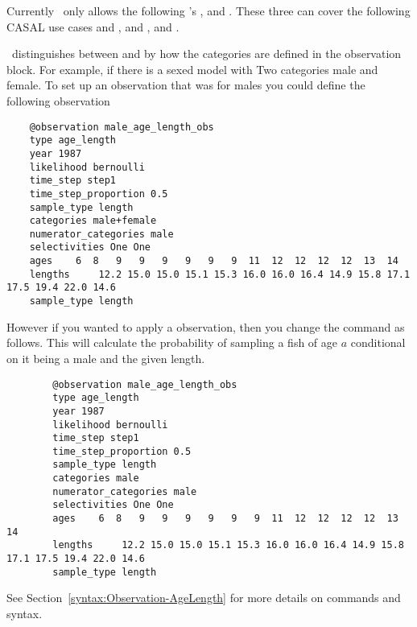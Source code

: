 Currently \CNAME\ only allows the following 's  ,   and . These three can cover the following CASAL use cases  and  ,  and  , and .


\CNAME\ distinguishes between  and  by how the categories are defined in the observation block. For example, if there is a sexed model with Two categories male and female. To set up an observation that was  for males you could define the following observation
{\small{\begin{verbatim}
	@observation male_age_length_obs
	type age_length
	year 1987
	likelihood bernoulli
	time_step step1
	time_step_proportion 0.5
	sample_type length
	categories male+female
	numerator_categories male
	selectivities One One
	ages   	6  8   9   9   9   9   9   9  11  12  12  12  12  13  14  
	lengths 	12.2 15.0 15.0 15.1 15.3 16.0 16.0 16.4 14.9 15.8 17.1 17.5 19.4 22.0 14.6 
	sample_type length
\end{verbatim}}}

However if you wanted to apply a  observation, then you change the  command as follows. This will calculate the probability of sampling a fish of age \(a\) conditional on it being a male and the given length.

{\small{\begin{verbatim}
		@observation male_age_length_obs
		type age_length
		year 1987
		likelihood bernoulli
		time_step step1
		time_step_proportion 0.5
		sample_type length
		categories male
		numerator_categories male
		selectivities One One
		ages   	6  8   9   9   9   9   9   9  11  12  12  12  12  13  14  
		lengths 	12.2 15.0 15.0 15.1 15.3 16.0 16.0 16.4 14.9 15.8 17.1 17.5 19.4 22.0 14.6 
		sample_type length
		\end{verbatim}}}

See Section~\ref{syntax:Observation-AgeLength} for more details on commands and syntax.

\fi

\paragraph*{}\label{sec:Observation-ProportionsByCategory}

